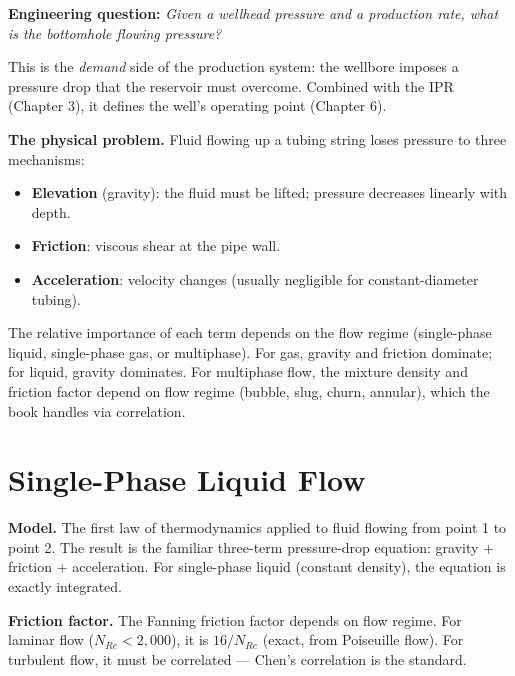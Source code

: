 \documentclass[11pt,a4paper,openany]{book}
\begin{document}
\begin{purpose}
\textbf{Engineering question:} \emph{Given a wellhead pressure and a
production rate, what is the bottomhole flowing pressure?}

This is the \emph{demand} side of the production system: the wellbore
imposes a pressure drop that the reservoir must overcome. Combined
with the IPR (Chapter 3), it defines the well's operating point
(Chapter 6).
\end{purpose}

\begin{theory}
\textbf{The physical problem.} Fluid flowing up a tubing string loses
pressure to three mechanisms:
\begin{itemize}
  \item \textbf{Elevation} (gravity): the fluid must be lifted;
        pressure decreases linearly with depth.
  \item \textbf{Friction}: viscous shear at the pipe wall.
  \item \textbf{Acceleration}: velocity changes (usually negligible
        for constant-diameter tubing).
\end{itemize}

The relative importance of each term depends on the flow regime
(single-phase liquid, single-phase gas, or multiphase). For gas,
gravity and friction dominate; for liquid, gravity dominates. For
multiphase flow, the mixture density and friction factor depend on
flow regime (bubble, slug, churn, annular), which the book handles
via correlation.
\end{theory}

\section{Single-Phase Liquid Flow}

\begin{theory}
\textbf{Model.} The first law of thermodynamics applied to fluid
flowing from point 1 to point 2. The result is the familiar three-term
pressure-drop equation: gravity + friction + acceleration. For
single-phase liquid (constant density), the equation is exactly
integrated.

\textbf{Friction factor.} The Fanning friction factor depends on flow
regime. For laminar flow ($N_{Re} < 2{,}000$), it is $16/N_{Re}$
(exact, from Poiseuille flow). For turbulent flow, it must be
correlated — Chen's correlation is the standard.
\end{theory}
\end{document}
